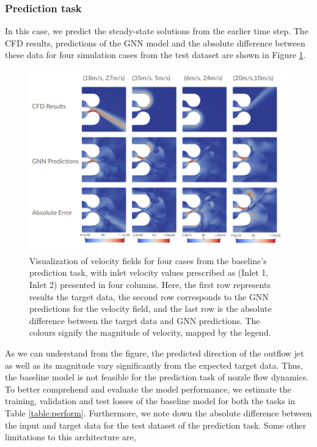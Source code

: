 \subsubsection{Prediction task}
In this case, we predict the steady-state solutions from the earlier time step. The CFD results, predictions of the GNN model and the absolute difference between these data for four simulation cases from the test dataset are shown in Figure \ref{blpred}.
\begin{figure}[ht]
    \centering
    \includegraphics[width=14cm]{images/Methodology/Baselineprediction.png}
    \caption{Visualization of velocity fields for four cases from the baseline's prediction task, with inlet velocity values prescribed as (Inlet 1, Inlet 2) presented in four columns. Here, the first row represents results the target data, the second row corresponds to the GNN predictions for the velocity field, and the last row is the absolute difference between the target data and GNN predictions. The colours signify the magnitude of velocity, mapped by the legend.} 
    \label{blpred}
\end{figure}
As we can understand from the figure, the predicted direction of the outflow jet as well as its magnitude vary significantly from the expected target data. Thus, the baseline model is not feasible for the prediction task of nozzle flow dynamics. To better comprehend and evaluate the model performance, we estimate the training, validation and test losses of the baseline model for both the tasks in Table \ref{table:perform}. Furthermore, we note down the absolute difference between the input and target data for the test dataset of the prediction task. Some other limitations to this architecture are,  

